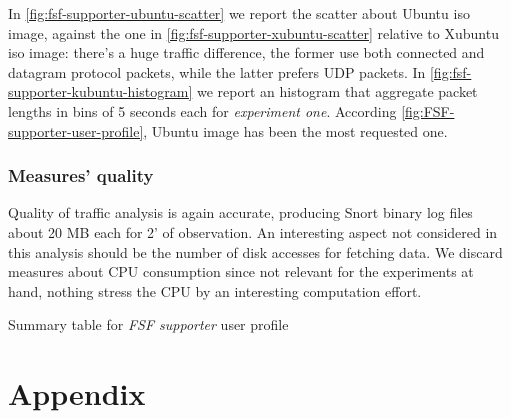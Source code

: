 \documentclass[10pt,a4paper]{article}
\begin{document}
    In \autoref{fig:fsf-supporter-ubuntu-scatter} we report the
    scatter about Ubuntu iso image, against the one in
    \autoref{fig:fsf-supporter-xubuntu-scatter} relative to Xubuntu
    iso image: there's a huge traffic difference, the former use both
    connected and datagram protocol packets, while the latter prefers
    UDP packets. In \autoref{fig:fsf-supporter-kubuntu-histogram} we
    report an histogram that aggregate packet lengths in bins of 5
    seconds each for \emph{experiment one}. According
    \autoref{fig:FSF-supporter-user-profile}, Ubuntu image has been
    the most requested one.

    \subsubsection*{Measures' quality}
    Quality of traffic analysis is again accurate, producing Snort
    binary log files about 20 MB each for 2' of observation. An
    interesting aspect not considered in this analysis should be the
    number of disk accesses for fetching data. We discard measures
    about CPU consumption since not relevant for the experiments at
    hand, nothing stress the CPU by an interesting computation effort.

    \begin{table}
      \begin{adjustwidth}{-2cm}{}
        
      \end{adjustwidth}
      \caption{Summary table for \emph{FSF supporter} user profile}
      \label{fig:FSF-supporter-user-profile}
    \end{table}


    \newpage

    \section{Appendix}
    \label{sec:appendix}
\end{document}
